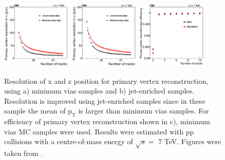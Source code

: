 \begin{figure}[ht]
  \begin{center}
    \includegraphics[width=0.3\textwidth]{figuras/Chapter3/RecoVertex_x_resolution.png}
    \includegraphics[width=0.3\textwidth]{figuras/Chapter3/RecoVertex_y_resolution.png}
    \includegraphics[width=0.3\textwidth]{figuras/Chapter3/Effciiency_vertex_resolution.png}
    \caption{Resolution of x and z position  for primary vertex reconstruction, using a) minimum vias samples and b) jet-enriched samples. 
    Resolution is improved using jet-enriched samples since in these sample the mean of $\textrm{p}_{\textrm{T}}$ is larger than minimum vias samples.  
    For efficiency of primary vertex reconstruction shown in c), minimum vias MC samples were used. Results were estimated 
    with pp collisions with a centre-of-mass energy of $\sqrt{s} =$  7 TeV. Figures were taken from \cite{Chatrchyan:2014fea}.}
    \label{fig:RecoVertex}
  \end{center}
\end{figure}



